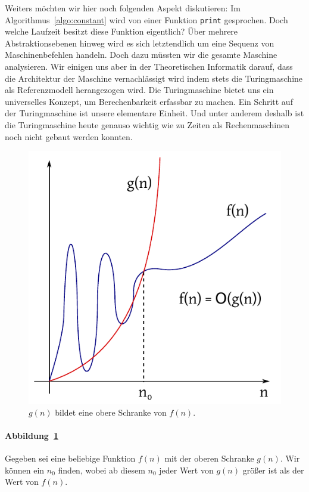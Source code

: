 Weiters möchten wir hier noch folgenden Aspekt diskutieren: Im Algorithmus~\ref{algo:constant} wird von einer Funktion \texttt{print} gesprochen. Doch welche Laufzeit besitzt diese Funktion eigentlich? Über mehrere Abstraktionsebenen hinweg wird es sich letztendlich um eine Sequenz von Maschinenbefehlen handeln. Doch dazu müssten wir die gesamte Maschine analysieren. Wir einigen uns aber in der Theoretischen Informatik darauf, dass die Architektur der Maschine vernachlässigt wird indem stets die Turingmaschine als Referenzmodell herangezogen wird. Die Turingmaschine bietet uns ein universelles Konzept, um Berechenbarkeit erfassbar zu machen. Ein Schritt auf der Turingmaschine ist unsere elementare Einheit. Und unter anderem deshalb ist die Turingmaschine heute genauso wichtig wie zu Zeiten als Rechenmaschinen noch nicht gebaut werden konnten.
%
\begin{figure}[h]
 \begin{center}
  \includegraphics{img/upper_bound.pdf}
  \caption{$g(n)$ bildet eine obere Schranke von $f(n)$.}
  \label{fig:upper}
 \end{center}
\end{figure}

\paragraph{Abbildung~\ref{fig:upper}}
Gegeben sei eine beliebige Funktion $f(n)$ mit der oberen Schranke $g(n)$. Wir können ein $n_0$ finden, wobei ab diesem $n_0$ jeder Wert von $g(n)$ größer ist als der Wert von $f(n)$.
%
